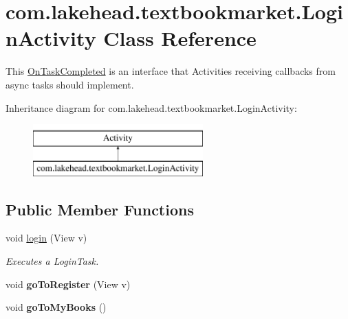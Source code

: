 \hypertarget{classcom_1_1lakehead_1_1textbookmarket_1_1_login_activity}{\section{com.\-lakehead.\-textbookmarket.\-Login\-Activity Class Reference}
\label{classcom_1_1lakehead_1_1textbookmarket_1_1_login_activity}
}


This \hyperlink{interfacecom_1_1lakehead_1_1textbookmarket_1_1_on_task_completed}{On\-Task\-Completed} is an interface that Activities receiving callbacks from async tasks should implement.  


Inheritance diagram for com.\-lakehead.\-textbookmarket.\-Login\-Activity\-:\begin{figure}[H]
\begin{center}
\leavevmode
\includegraphics[height=2.000000cm]{classcom_1_1lakehead_1_1textbookmarket_1_1_login_activity}
\end{center}
\end{figure}
\subsection*{Public Member Functions}
\begin{DoxyCompactItemize}
\item 
void \hyperlink{classcom_1_1lakehead_1_1textbookmarket_1_1_login_activity_a97ed0e2b55ba0fb0d6a6a9c94fb10c79}{login} (View v)
\begin{DoxyCompactList}\small\item\em Executes a Login\-Task. \end{DoxyCompactList}\item 
\hypertarget{classcom_1_1lakehead_1_1textbookmarket_1_1_login_activity_a0e2db8d9bd08f6f8583462a8a6c2ea46}{void {\bfseries go\-To\-Register} (View v)}\label{classcom_1_1lakehead_1_1textbookmarket_1_1_login_activity_a0e2db8d9bd08f6f8583462a8a6c2ea46}

\item 
\hypertarget{classcom_1_1lakehead_1_1textbookmarket_1_1_login_activity_a6dcb0bab003f93dab600880384d3b225}{void {\bfseries go\-To\-My\-Books} ()}\label{classcom_1_1lakehead_1_1textbookmarket_1_1_login_activity_a6dcb0bab003f93dab600880384d3b225}

\end{DoxyCompactItemize}
